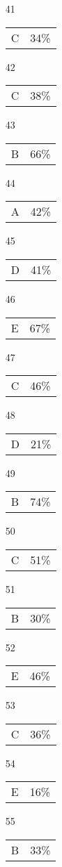 \documentclass[12pt]{article}
\begin{document}
\begin{multicols}{5}
\begin{enumerate}
\item[41] \begin{tabular}{cc} C& 34\%\end{tabular}
\item[42] \begin{tabular}{cc} C & 38\%\end{tabular}
\item[43] \begin{tabular}{cc} B & 66\%\end{tabular}
\item[44] \begin{tabular}{cc} A & 42\%\end{tabular}
\item[45] \begin{tabular}{cc} D & 41\%\end{tabular}
\item[]
\item[46] \begin{tabular}{cc} E & 67\%\end{tabular}
\item[47] \begin{tabular}{cc} C & 46\%\end{tabular}
\item[48] \begin{tabular}{cc} D & 21\%\end{tabular}
\item[49] \begin{tabular}{cc} B & 74\%\end{tabular}
\item[50] \begin{tabular}{cc} C & 51\%\end{tabular}
\item[]
\item[51] \begin{tabular}{cc} B & 30\%\end{tabular}
\item[52] \begin{tabular}{cc} E & 46\%\end{tabular}
\item[53] \begin{tabular}{cc} C & 36\%\end{tabular}
\item[54] \begin{tabular}{cc} E & 16\%\end{tabular}
\item[55] \begin{tabular}{cc} B & 33\%\end{tabular}

\end{enumerate}
\end{multicols}
\end{document}
